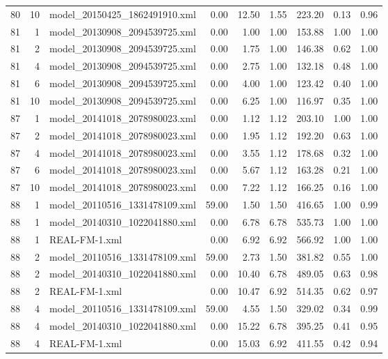 \begin{table}[ht]
\begin{tabular}{rrlrrrrrr}
   80 &  10 & model\_20150425\_1862491910.xml & 0.00 & 12.50 & 1.55 & 223.20 & 0.13 & 0.96 \\ 
   81 &   1 & model\_20130908\_2094539725.xml & 0.00 & 1.00 & 1.00 & 153.88 & 1.00 & 1.00 \\ 
   81 &   2 & model\_20130908\_2094539725.xml & 0.00 & 1.75 & 1.00 & 146.38 & 0.62 & 1.00 \\ 
   81 &   4 & model\_20130908\_2094539725.xml & 0.00 & 2.75 & 1.00 & 132.18 & 0.48 & 1.00 \\ 
   81 &   6 & model\_20130908\_2094539725.xml & 0.00 & 4.00 & 1.00 & 123.42 & 0.40 & 1.00 \\ 
   81 &  10 & model\_20130908\_2094539725.xml & 0.00 & 6.25 & 1.00 & 116.97 & 0.35 & 1.00 \\ 
   87 &   1 & model\_20141018\_2078980023.xml & 0.00 & 1.12 & 1.12 & 203.10 & 1.00 & 1.00 \\ 
   87 &   2 & model\_20141018\_2078980023.xml & 0.00 & 1.95 & 1.12 & 192.20 & 0.63 & 1.00 \\ 
   87 &   4 & model\_20141018\_2078980023.xml & 0.00 & 3.55 & 1.12 & 178.68 & 0.32 & 1.00 \\ 
   87 &   6 & model\_20141018\_2078980023.xml & 0.00 & 5.67 & 1.12 & 163.28 & 0.21 & 1.00 \\ 
   87 &  10 & model\_20141018\_2078980023.xml & 0.00 & 7.22 & 1.12 & 166.25 & 0.16 & 1.00 \\ 
   88 &   1 & model\_20110516\_1331478109.xml & 59.00 & 1.50 & 1.50 & 416.65 & 1.00 & 0.99 \\ 
   88 &   1 & model\_20140310\_1022041880.xml & 0.00 & 6.78 & 6.78 & 535.73 & 1.00 & 1.00 \\ 
   88 &   1 & REAL-FM-1.xml & 0.00 & 6.92 & 6.92 & 566.92 & 1.00 & 1.00 \\ 
   88 &   2 & model\_20110516\_1331478109.xml & 59.00 & 2.73 & 1.50 & 381.82 & 0.55 & 1.00 \\ 
   88 &   2 & model\_20140310\_1022041880.xml & 0.00 & 10.40 & 6.78 & 489.05 & 0.63 & 0.98 \\ 
   88 &   2 & REAL-FM-1.xml & 0.00 & 10.47 & 6.92 & 514.35 & 0.62 & 0.97 \\ 
   88 &   4 & model\_20110516\_1331478109.xml & 59.00 & 4.55 & 1.50 & 329.02 & 0.34 & 0.99 \\ 
   88 &   4 & model\_20140310\_1022041880.xml & 0.00 & 15.22 & 6.78 & 395.25 & 0.41 & 0.95 \\ 
   88 &   4 & REAL-FM-1.xml & 0.00 & 15.03 & 6.92 & 411.55 & 0.42 & 0.94 \\ 

\end{tabular}
\end{table}
